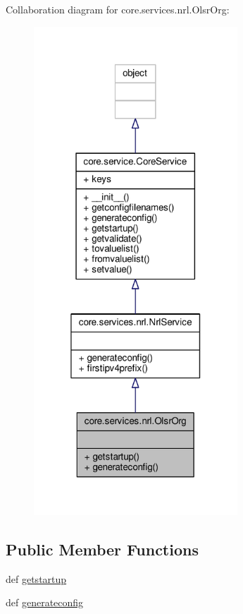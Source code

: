 Collaboration diagram for core.\+services.\+nrl.\+Olsr\+Org\+:
\nopagebreak
\begin{figure}[H]
\begin{center}
\leavevmode
\includegraphics[width=217pt]{classcore_1_1services_1_1nrl_1_1_olsr_org__coll__graph}
\end{center}
\end{figure}
\subsection*{Public Member Functions}
\begin{DoxyCompactItemize}
\item 
def \hyperlink{classcore_1_1services_1_1nrl_1_1_olsr_org_af1bb8ee5fb4cfc02ea5b840a9fb5aad3}{getstartup}
\item 
def \hyperlink{classcore_1_1services_1_1nrl_1_1_olsr_org_a0dcc569146d0ba9cf88d1db14e607831}{generateconfig}
\end{DoxyCompactItemize}
